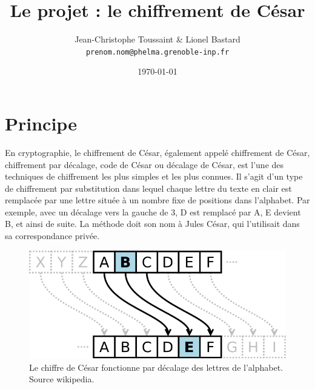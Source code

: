 \documentclass[a4paper, 12pt]{article}
\begin{document}


\title{Le projet : le chiffrement de César}

\author{Jean-Christophe Toussaint \& Lionel Bastard \\
 \texttt{prenom.nom@phelma.grenoble-inp.fr}}
\date{\today}
 
\maketitle



\section{Principe}

En cryptographie, le chiffrement de César, également appelé chiffrement de César, chiffrement par décalage, code de César ou décalage de César, est l'une des techniques de chiffrement les plus simples et les plus connues. Il s'agit d'un type de chiffrement par substitution dans lequel chaque lettre du texte en clair est remplacée par une lettre située à un nombre fixe de positions dans l'alphabet. Par exemple, avec un décalage vers la gauche de 3, D est remplacé par A, E devient B, et ainsi de suite. La méthode doit son nom à Jules César, qui l'utilisait dans sa correspondance privée.

\begin{figure}[h!]
\centering
\includegraphics[scale=0.3]{660px-Caesar3.png}
\caption{Le chiffre de César fonctionne par décalage des lettres de l'alphabet. Source wikipedia.}
\label{cesar}
\end{figure}
\end{document}
